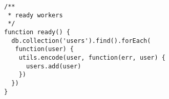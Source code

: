 
\lstset{language=C}

\begin{lstlisting}[frame=single]
/**
 * ready workers
 */
function ready() {
  db.collection('users').find().forEach(
   function(user) {
    utils.encode(user, function(err, user) {
      users.add(user)
    })
  })
}
\end{lstlisting}